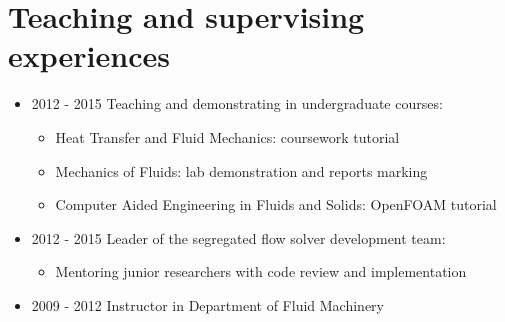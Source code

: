 \documentclass[letterpaper]{article}
\begin{document}
\vspace{-12pt}
\section*{Teaching and supervising experiences}
\vspace{-10pt}

\begin{itemize}
\item	2012 - 2015  \hspace{2pt} Teaching and demonstrating in undergraduate courses:
			\begin{itemize}
			\item Heat Transfer and Fluid Mechanics: coursework tutorial
			\item Mechanics of Fluids: lab demonstration and reports marking
			\item Computer Aided Engineering in Fluids and Solids: OpenFOAM tutorial
			\end{itemize}

\item 2012 - 2015 \hspace{2pt} Leader of the segregated flow solver development team:
		\begin{itemize}
		\item Mentoring junior researchers with code review and implementation
		\end{itemize} 
\item	2009 - 2012  \hspace{2pt} Instructor in Department of Fluid Machinery
\end{itemize}

\end{document}
